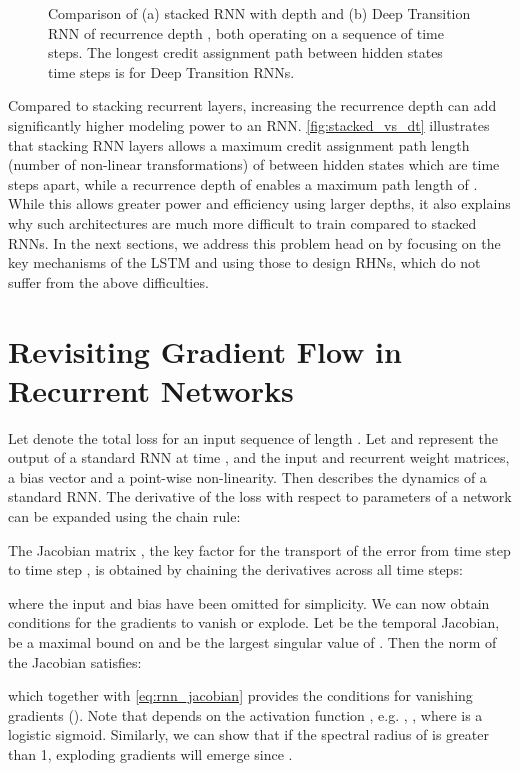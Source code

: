 \documentclass[letterpaper]{article}
\def\srnn{standard RNN}
\begin{document}
\begin{figure}[t]
\centering
\caption{Comparison of (a) stacked RNN with depth  and (b) Deep Transition RNN of recurrence depth , both operating on a sequence of  time steps. The longest credit assignment path between hidden states  time steps is  for Deep Transition RNNs.}
\label{fig:stacked_vs_dt}
\vspace{-5mm}
\end{figure}

Compared to stacking recurrent layers, increasing the recurrence depth can add significantly higher modeling power to an RNN.
\autoref{fig:stacked_vs_dt} illustrates that stacking  RNN layers allows a maximum credit assignment path length (number of non-linear transformations) of  between hidden states which are  time steps apart, while a recurrence depth of  enables a maximum path length of .
While this allows greater power and efficiency using larger depths, it also explains why such architectures are much more difficult to train compared to stacked RNNs.
In the next sections, we address this problem head on by focusing on the key mechanisms of the LSTM and using those to design RHNs, which do not suffer from the above difficulties.

\section{Revisiting Gradient Flow in Recurrent Networks}
Let  denote the total loss for an input sequence of length .
Let  and  represent the output of a \srnn{} at time ,  and  the input and recurrent weight matrices,  a bias vector and  a point-wise non-linearity. 
Then  describes the dynamics of a \srnn{}.
The derivative of the loss  with respect to parameters  of a network can be expanded using the chain rule:


The Jacobian matrix , the key factor for the transport of the error from time step  to time step , is obtained by chaining the derivatives across all time steps:

where the input and bias have been omitted for simplicity.
We can now obtain conditions for the gradients to vanish or explode. 
Let  be the temporal Jacobian,  be a maximal bound on  and  be the largest singular value of . Then the norm of the Jacobian satisfies:


 
which together with \eqref{eq:rnn_jacobian} provides the conditions for vanishing gradients ().
Note that  depends on the activation function , e.g. , , where  is a logistic sigmoid.
Similarly, we can show that if the spectral radius  of  is greater than 1, exploding gradients will emerge since
.
\end{document}
